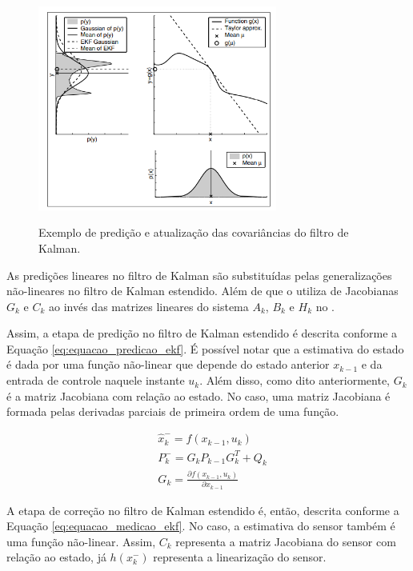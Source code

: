 \documentclass[acronym, symbols, table]{fei}
\begin{document}
			\begin{figure}[!htb]
				\centering
				\caption{Exemplo de predição e atualização das covariâncias do filtro de Kalman.}
				\includegraphics[width=0.7\textwidth]{figura_linearizacao_ekf.png}
				\label{fig:ekf_linearizacao}
			\end{figure}
			
			As predições lineares no filtro de Kalman são substituídas pelas generalizações não-lineares no filtro de Kalman estendido. Além de que o  utiliza de Jacobianas $G_k$ e $C_k$ ao invés das matrizes lineares do sistema $A_k$, $B_k$ e $H_k$ no .
			
			Assim, a etapa de predição no filtro de Kalman estendido é descrita conforme a Equação \ref{eq:equacao_predicao_ekf}. É possível notar que a estimativa do estado é dada por uma função não-linear que depende do estado anterior $x_{k-1}$ e da entrada de controle naquele instante $u_{k}$. Além disso, como dito anteriormente, $G_{k}$ é a matriz Jacobiana com relação ao estado. No caso, uma matriz Jacobiana é formada pelas derivadas parciais de primeira ordem de uma função.
			
			\begin{equation} \label{eq:equacao_predicao_ekf}
				\begin{split}
					&\hat{x}_{k}^{-} = f(x_{k-1}, u_{k}) \\
					&P_{k}^{-} = G_{k}P_{k-1}G_{k}^{T} + Q_{k} \\
					&G_{k} = \frac{\partial f(x_{k-1}, u_{k})}{\partial x_{k-1}} 
				\end{split}
			\end{equation}
			
			A etapa de correção no filtro de Kalman estendido é, então, descrita conforme a Equação \ref{eq:equacao_medicao_ekf}. No caso, a estimativa do sensor também é uma função não-linear. Assim, $C_k$ representa a matriz Jacobiana do sensor com relação ao estado, já $h(x_{k}^{-})$ representa a linearização do sensor.
			
\end{document}
